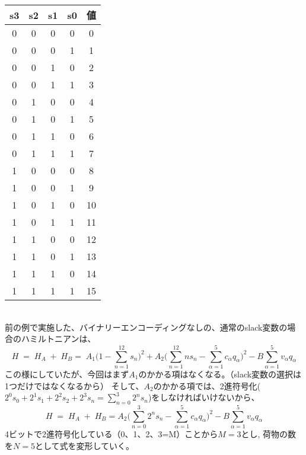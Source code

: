 \documentclass[uplatex,dvipdfmx,a4paper,11pt,oneside,openany]{jsbook}
\begin{document}
\begin{tabular}{|c|c|c|c|c|}\hline
  s3&s2&s1&s0&値\\\hline
  0&0&0&0& 0\\
  0&0&0&1& 1\\
  0&0&1&0& 2\\
  0&0&1&1& 3\\
  0&1&0&0& 4\\
  0&1&0&1& 5\\
  0&1&1&0& 6\\
  0&1&1&1& 7\\
  1&0&0&0& 8\\
  1&0&0&1& 9\\
  1&0&1&0& 10\\
  1&0&1&1& 11\\
  1&1&0&0& 12\\\hline
  1&1&0&1& 13\\
  1&1&1&0& 14\\
  1&1&1&1& 15\\\hline
\end{tabular}\\

前の例で実施した、バイナリーエンコーディングなしの、通常のslack変数の場合のハミルトニアンは、
\[
  H\;=\;H_A\;+\;H_B
  =\;A_1\bigg(1-\sum_{n=1}^{12}s_n\bigg)^2 + A_2\bigg(\sum_{n=1}^{12}n s_n- \sum_{\alpha=1}^{5}c_\alpha q_\alpha\bigg)^2 - B\sum_{\alpha=1}^{5}v_\alpha q_\alpha
\]
この様にしていたが、今回はまず$A_1$のかかる項はなくなる。（slack変数の選択は1つだけではなくなるから）
そして、$A_2$のかかる項では、2進符号化($2^0 s_0 + 2^1 s_1 + 2^2 s_2 + 2^3 s_n=\sum_{n=0}^3 2^n s_n$)をしなければいけないから、
\[
  H\;=\;H_A\;+\;H_B
  =A_2\bigg(\sum_{n=0}^{3}2^n s_n- \sum_{\alpha=1}^{5}c_\alpha q_\alpha\bigg)^2 - B\sum_{\alpha=1}^{5}v_\alpha q_\alpha
\]
4ビットで2進符号化している（0、1、2、3=M）ことから$M=3$とし, 荷物の数を$N=5$として式を変形していく。
\end{document}
